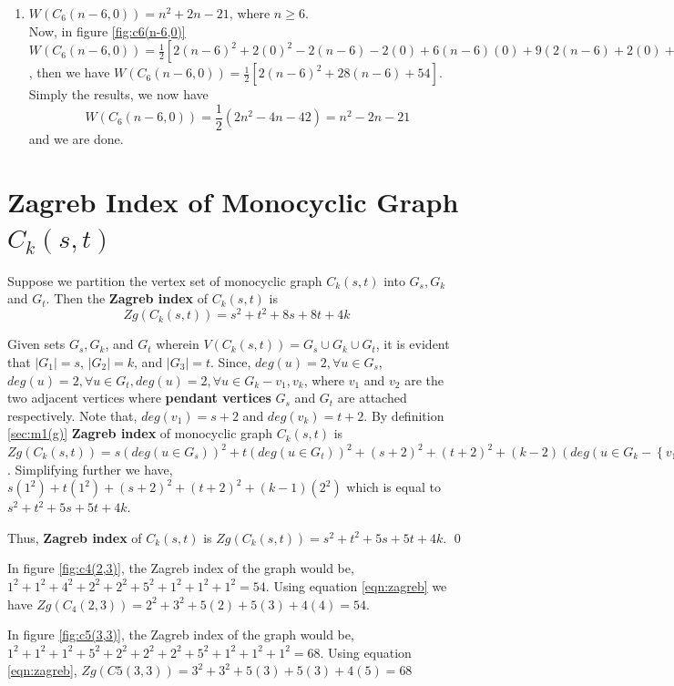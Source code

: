 \begin{e.g.}
\begin{e.g.}
\begin{enumerate}
\item {$W(C_6(n-6,0))=n^2+2n-21$, where $n\geq 6$.\\
Now, in figure \ref{fig:c6(n-6,0)}
$W(C_6(n-6,0))=\frac{1}{2}[2(n-6)^2+2(0)^2-2(n-6)-2(0)+6(n-6)(0)+9(2(n-6)+2(0)+6)+12(n-6)+12(0)]$, then we have $W(C_6(n-6,0))=\frac{1}{2}[2(n-6)^2+28(n-6)+54]$. Simply the results, we now have
$$
W(C_6(n-6,0))=\frac{1}{2}(2n^2-4n-42)=n^2-2n-21
$$ 
and we are done.}
\end{enumerate}
\end{e.g.}


\section{Zagreb Index of Monocyclic Graph $C_k(s,t)$}

\begin{thm}\rm
Suppose we partition the vertex set of monocyclic graph $C_k(s,t)$ into $G_s,G_k$ and $G_t$. Then the \textbf{Zagreb index} of $C_k(s,t)$ is
\begin{equation}
Zg(C_k(s,t))=s^2+t^2+8s+8t+4k
\label{eqn:zagreb}
\end{equation}
\label{thm:zagreb_mg} 
\end{thm}
\proof Given sets $G_s,G_k$, and $G_t$ wherein $V(C_k(s,t))=G_s\cup G_k\cup G_t$, it is evident that $|G_1|=s$, $|G_2|=k$, and $|G_3|=t$. Since, $deg(u)=2,\forall u\in G_s$, $deg(u)=2,\forall u \in G_t, deg(u)=2, \forall u \in G_k-{v_1,v_k} $, where $v_1$ and $v_2$ are the two adjacent vertices where \textbf{pendant vertices} $G_s$ and $G_t$ are attached respectively. Note that, $deg(v_1)=s+2$ and $deg(v_k)=t+2$. By definition \href{chap2.tex}{\ref{sec:m1(g)}} \textbf{Zagreb index} of monocyclic graph $C_k(s,t)$ is $Zg(C_k(s,t))=s(deg(u\in G_s))^2+t(deg(u\in G_t))^2+(s+2)^2+(t+2)^2+(k-2)(deg(u\in G_k-\left\lbrace v_1,v_k \right\rbrace))$. Simplifying further we have, $s(1^2)+t(1^2)+(s+2)^2+(t+2)^2+(k-1)(2^2)$ which is equal to $s^2+t^2+5s+5t+4k$. \medskip 

Thus, \textbf{Zagreb index} of $C_k(s,t)$ is $Zg(C_k(s,t))=s^2+t^2+5s+5t+4k$. \qed

\begin{e.g.}\rm
In figure \ref{fig:c4(2,3)}, the Zagreb index of the graph would be, $1^2+1^2+4^2+2^2+2^2+5^2+1^2+1^2+1^2=54$. Using equation \ref{eqn:zagreb} we have $Zg(C_4(2,3))=2^2+3^2+5(2)+5(3)+4(4)=54$.
\end{e.g.}

\begin{e.g.}\rm
In figure \ref{fig:c5(3,3)}, the Zagreb index of the graph would be, $1^2+1^2+1^2+5^2+2^2+2^2+2^2+5^2+1^2+1^2+1^2=68$. Using equation \ref{eqn:zagreb}, $Zg(C5(3,3))=3^2+3^2+5(3)+5(3)+4(5)=68$
\end{e.g.}


\end{e.g.}
